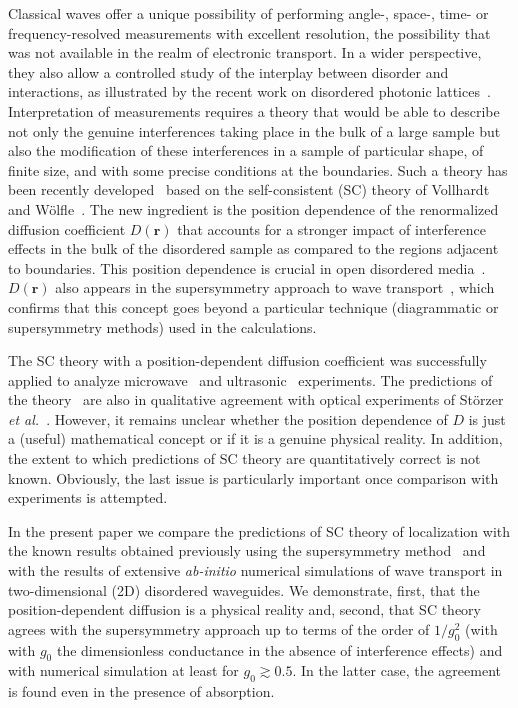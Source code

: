 Classical waves offer a unique possibility of performing angle-, space-, time- or frequency-resolved measurements with excellent resolution, the possibility that was not available in the realm of electronic transport. In a wider perspective, they also allow a controlled study of the interplay between disorder and interactions, as illustrated by the recent work on disordered photonic lattices~\cite{2007_Segev}.
Interpretation of measurements requires a theory that would be able to describe not only the genuine interferences taking place in the bulk of a large sample but also the modification of these interferences in a sample of particular shape, of finite size, and with some precise conditions at the boundaries. Such a theory has been recently developed~\cite{2000_van_Tiggelen,2004_Skipetrov,2006_Skipetrov_dynamics,2008_Cherroret} based on the self-consistent (SC) theory of Vollhardt and W\"{o}lfle~\cite{1980_Vollhardt_Wolfle}. The new ingredient is the position dependence of the renormalized diffusion coefficient $D(\mathbf{r})$ that accounts for a stronger impact of interference effects in the bulk of the disordered sample as compared to the regions adjacent to boundaries. This position dependence is crucial in open disordered media~\cite{2009_Cherroret}. $D(\mathbf{r})$ also appears in the supersymmetry approach to wave transport~\cite{2008_Tian}, which confirms that this concept goes beyond a particular technique (diagrammatic or supersymmetry methods) used in the calculations.

The SC theory with a position-dependent diffusion coefficient was successfully applied to analyze microwave~\cite{2004_Skipetrov} and ultrasonic~\cite{2008_van_Tiggelen_Nature} experiments. The predictions of the theory~\cite{2006_Skipetrov_dynamics} are also in qualitative agreement with optical experiments of St\"{o}rzer \textit{et al.}~\cite{2006_Maret_PRL}. However, it remains unclear whether the position dependence of $D$ is just a (useful) mathematical concept or if it is a genuine physical reality. In addition, the extent to which predictions of SC theory are quantitatively correct is not known. Obviously, the last issue is particularly important once comparison with experiments is attempted.

In the present paper we compare the predictions of SC theory of localization with the known results obtained previously using the supersymmetry method~\cite{2000_Mirlin} and with the results of extensive \textit{ab-initio} numerical simulations of wave transport in two-dimensional (2D) disordered waveguides. We demonstrate, first, that the position-dependent diffusion is a physical reality and, second, that SC theory agrees with the supersymmetry approach up to terms of the order of $1/g_0^2$ (with with $g_0$ the dimensionless conductance in the absence of interference effects) and with numerical simulation at least for $g_0 \gtrsim 0.5$. In the latter case, the agreement is found even in the presence of absorption.

